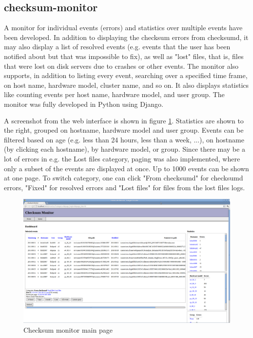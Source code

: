 \subsection{checksum-monitor}
A monitor for individual events (errors) and statistics over multiple events have been developed. In addition to displaying the checksum errors from checksumd, it may also display a list of resolved events (e.g. events that the user has been notified about but that was impossible to fix), as well as "lost" files, that is, files that were lost on disk servers due to crashes or other events.  The monitor also supports, in addition to listing every event, searching over a specified time frame, on host name, hardware model, cluster name, and so on. It also displays statistics like counting events per host name, hardware model, and user group. The monitor was fully developed in Python using Django. 

A screenshot from the web interface is shown in figure \ref{fig:monitor-index}. Statistics are shown to the right, grouped on hostname, hardware model and user group. Events can be filtered based on age (e.g. less than 24 hours, less than a week, ...), on hostname (by clicking each hostname), by hardware model, or group. Since there may be a lot of errors in e.g. the Lost files category, paging was also implemented, where only a subset of the events are displayed at once. Up to 1000 events can be shown at one page. To switch category, one can click "From checksumd" for checksumd errors, "Fixed" for resolved errors and "Lost files" for files from the lost files logs.

\begin{figure}[ht]
\centering
\includegraphics[width=\textwidth]{gfx/checksum-monitor-main}
\caption{Checksum monitor main page}
\label{fig:monitor-index}
\end{figure}

